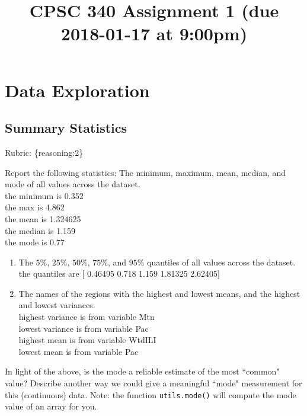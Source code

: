 \documentclass{article}
\def\blu#1{{\color{blu}#1}}
\def\gre#1{{\color{gre}#1}}
\def\enum#1{\begin{enumerate}#1\end{enumerate}}
\def\rubric#1{\gre{Rubric: \{#1\}}}{}
\begin{document}
\title{CPSC 340 Assignment 1 (due 2018-01-17 at 9:00pm)}

\date{}
\maketitle

\vspace{-6em}




\section{Data Exploration}



\subsection{Summary Statistics}
\rubric{reasoning:2}

\blu{Report the following statistics}:
The minimum, maximum, mean, median, and mode of all values across the dataset.\\

the minimum is  0.352 \\ the max is  4.862 \\the mean is  1.324625 \\the median is 1.159 \\the mode is  0.77\\


\enum{
\item The $5\%$, $25\%$, $50\%$, $75\%$, and $95\%$ quantiles of all values across the dataset.\\
the quantiles are [ 0.46495  0.718    1.159    1.81325  2.62405]\\
\item The names of the regions with the highest and lowest means, and the highest and lowest variances.\\
highest variance is from variable Mtn \\lowest variance is from variable Pac\\ highest mean is from variable WtdILI\\ lowest mean is from variable Pac\\
}
In light of the above, \blu{is the mode a reliable estimate of the most ``common" value? Describe another way we could give a meaningful ``mode" measurement for this (continuous) data.} Note: the function \texttt{utils.mode()} will compute the mode value of an array for you.\\
\end{document}
